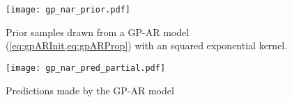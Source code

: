 \begin{figure}
    \centering
    \noindent\texttt{[image: gp\_nar\_prior.pdf]}
    \caption{Prior samples drawn from a GP-AR model (\cref{eq:gpARInit,eq:gpARProp}) with an squared exponential kernel.}
    \label{fig:gparPrior}
\end{figure}

\begin{figure}
    \centering
    \noindent\texttt{[image: gp\_nar\_pred\_partial.pdf]}
    \caption{Predictions made by the GP-AR model}
    \label{fig:gparPost}
\end{figure}

